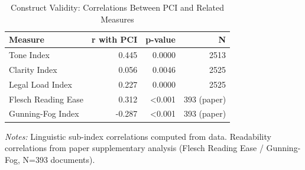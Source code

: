 \begin{table}[H]
\centering
\caption{Construct Validity: Correlations Between PCI and Related Measures}
\label{tab:table7_construct_validity}
\begin{threeparttable}
\small
\begin{tabular}{lrrr}
\toprule
\textbf{Measure} & \textbf{r with PCI} & \textbf{p-value} & \textbf{N} \\
\midrule
  Tone Index & 0.445 & 0.0000 & 2513 \\
  Clarity Index & 0.056 & 0.0046 & 2525 \\
  Legal Load Index & 0.227 & 0.0000 & 2525 \\
  Flesch Reading Ease & 0.312 & <0.001 & 393 (paper) \\
  Gunning-Fog Index & -0.287 & <0.001 & 393 (paper) \\
\bottomrule
\end{tabular}
\begin{tablenotes}\small
\item \textit{Notes:} Linguistic sub-index correlations computed from data. Readability correlations from paper supplementary analysis (Flesch Reading Ease / Gunning-Fog, N=393 documents).
\end{tablenotes}
\end{threeparttable}
\end{table}